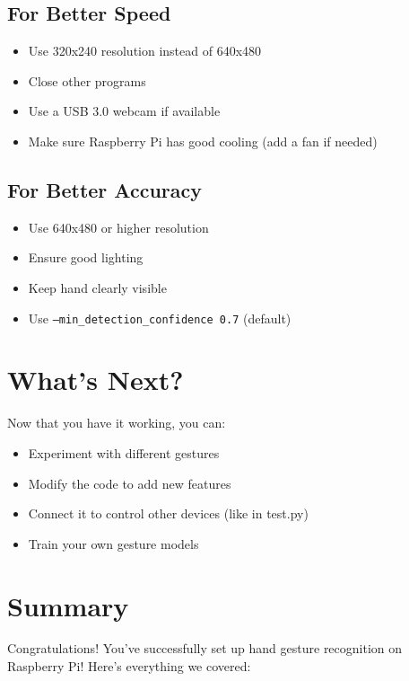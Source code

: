 \documentclass[12pt,a4paper]{article}
\begin{document}
\subsection{For Better Speed}

\begin{itemize}
    \item Use 320x240 resolution instead of 640x480
    \item Close other programs
    \item Use a USB 3.0 webcam if available
    \item Make sure Raspberry Pi has good cooling (add a fan if needed)
\end{itemize}

\subsection{For Better Accuracy}

\begin{itemize}
    \item Use 640x480 or higher resolution
    \item Ensure good lighting
    \item Keep hand clearly visible
    \item Use \texttt{--min\_detection\_confidence 0.7} (default)
\end{itemize}

\section{What's Next?}

Now that you have it working, you can:

\begin{itemize}
    \item Experiment with different gestures
    \item Modify the code to add new features
    \item Connect it to control other devices (like in test.py)
    \item Train your own gesture models
\end{itemize}

\section{Summary}

Congratulations! You've successfully set up hand gesture recognition on Raspberry Pi! Here's everything we covered:
\end{document}
